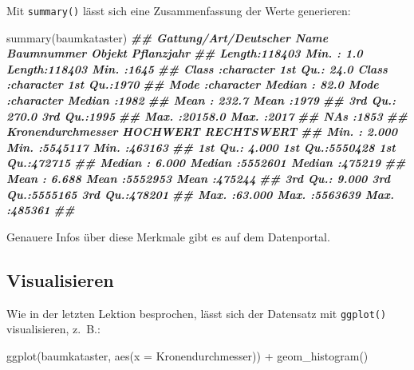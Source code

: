 \documentclass[
  ngerman,
]{article}
\newenvironment{Shaded}{\begin{snugshade}}{\end{snugshade}}
\newcommand{\AttributeTok}[1]{\textcolor[rgb]{0.77,0.63,0.00}{#1}}
\newcommand{\DocumentationTok}[1]{\textcolor[rgb]{0.56,0.35,0.01}{\textbf{\textit{#1}}}}
\newcommand{\FunctionTok}[1]{\textcolor[rgb]{0.00,0.00,0.00}{#1}}
\newcommand{\NormalTok}[1]{#1}
\newcommand{\SpecialCharTok}[1]{\textcolor[rgb]{0.00,0.00,0.00}{#1}}
\begin{document}
Mit \texttt{summary()} lässt sich eine Zusammenfassung der Werte generieren:

\begin{Shaded}
\begin{Highlighting}[]
\FunctionTok{summary}\NormalTok{(baumkataster)}
\DocumentationTok{\#\#  Gattung/Art/Deutscher Name   Baumnummer         Objekt            Pflanzjahr  }
\DocumentationTok{\#\#  Length:118403              Min.   :    1.0   Length:118403      Min.   :1645  }
\DocumentationTok{\#\#  Class :character           1st Qu.:   24.0   Class :character   1st Qu.:1970  }
\DocumentationTok{\#\#  Mode  :character           Median :   82.0   Mode  :character   Median :1982  }
\DocumentationTok{\#\#                             Mean   :  232.7                      Mean   :1979  }
\DocumentationTok{\#\#                             3rd Qu.:  270.0                      3rd Qu.:1995  }
\DocumentationTok{\#\#                             Max.   :20158.0                      Max.   :2017  }
\DocumentationTok{\#\#                             NA\textquotesingle{}s   :1853                                       }
\DocumentationTok{\#\#  Kronendurchmesser    HOCHWERT         RECHTSWERT    }
\DocumentationTok{\#\#  Min.   : 2.000    Min.   :5545117   Min.   :463163  }
\DocumentationTok{\#\#  1st Qu.: 4.000    1st Qu.:5550428   1st Qu.:472715  }
\DocumentationTok{\#\#  Median : 6.000    Median :5552601   Median :475219  }
\DocumentationTok{\#\#  Mean   : 6.688    Mean   :5552953   Mean   :475244  }
\DocumentationTok{\#\#  3rd Qu.: 9.000    3rd Qu.:5555165   3rd Qu.:478201  }
\DocumentationTok{\#\#  Max.   :63.000    Max.   :5563639   Max.   :485361  }
\DocumentationTok{\#\# }
\end{Highlighting}
\end{Shaded}

Genauere Infos über diese Merkmale gibt es auf dem Datenportal.

\hypertarget{visualisieren}{%
\subsection{Visualisieren}\label{visualisieren}}

Wie in der letzten Lektion besprochen, lässt sich der Datensatz mit \texttt{ggplot()} visualisieren, z.~B.:

\begin{Shaded}
\begin{Highlighting}[]
\FunctionTok{ggplot}\NormalTok{(baumkataster, }\FunctionTok{aes}\NormalTok{(}\AttributeTok{x =}\NormalTok{ Kronendurchmesser)) }\SpecialCharTok{+}
  \FunctionTok{geom\_histogram}\NormalTok{()}
\end{Highlighting}
\end{Shaded}
\end{document}
